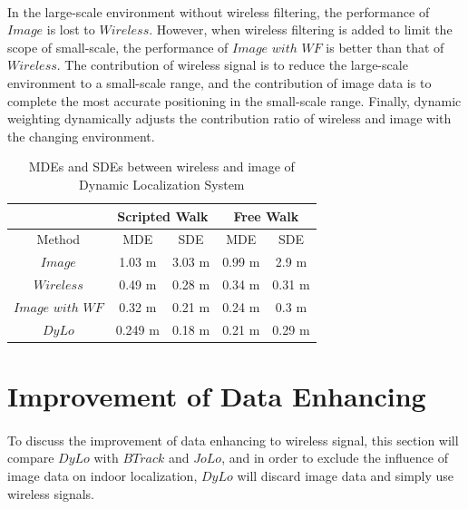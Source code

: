 \documentclass[a4paper,12pt]{report}
\begin{document}
\paragraph{}
In the large-scale environment without wireless filtering, the performance of $Image$ is lost to $Wireless$. However, when wireless filtering is added to limit the scope of small-scale, the performance of $Image$ $with$ $WF$ is better than that of $Wireless$. The contribution of wireless signal is to reduce the large-scale environment to a small-scale range, and the contribution of image data is to complete the most accurate positioning in the small-scale range. Finally, dynamic weighting dynamically adjusts the contribution ratio of wireless and image with the changing environment.

\begin{table}
    \begin{center}
    \caption{MDEs and SDEs between wireless and image of Dynamic Localization System}
    \label{table:5_2_MDEs_and_SDEs_between_wireless_and_image_of_Dynamic_Localization_System}
        \begin{tabular}{|c||c|c||c|c|}
            \hline
                & \multicolumn{2}{|c|}{Scripted Walk} & \multicolumn{2}{|c|}{Free Walk} \\
            \hline
                Method & MDE & SDE & MDE & SDE \\
            \hline
            \hline
                $Image$    & 1.03 m  & 3.03 m & 0.99 m & 2.9 m \\
            \hline
                $Wireless$ & 0.49 m  & 0.28 m & 0.34 m & 0.31 m \\
            \hline
                $Image$ $with$ $WF$ & 0.32 m & 0.21 m & 0.24 m & 0.3 m \\
            \hline
                $DyLo$   & 0.249 m & 0.18 m & 0.21 m & 0.29 m \\
            \hline
        \end{tabular}
    \end{center}
\end{table}

\section{Improvement of Data Enhancing}
\paragraph{}
To discuss the improvement of data enhancing to wireless signal, this section will compare $DyLo$ with $BTrack$ and $JoLo$, and in order to exclude the influence of image data on indoor localization, $DyLo$ will discard image data and simply use wireless signals.
%
\end{document}
